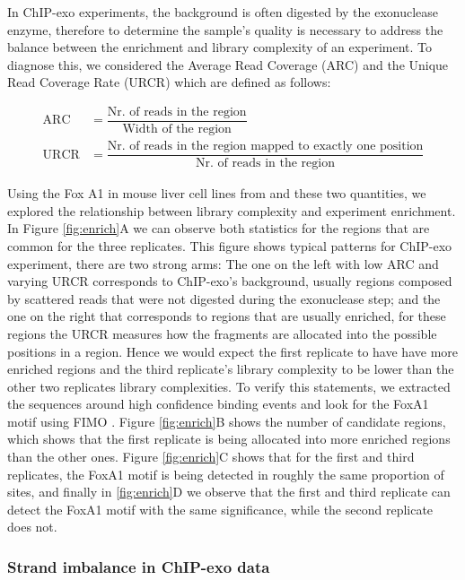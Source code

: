 \documentclass{bmcart}\usepackage[]{graphicx}\usepackage[]{color}
\begin{document}
In ChIP-exo experiments, the background is often digested by the
exonuclease enzyme, therefore to determine the sample's quality is
necessary to address the balance between the enrichment and library
complexity of an experiment. To diagnose this, we considered the
Average Read Coverage (ARC) and the Unique Read Coverage Rate (URCR)
which are defined as follows:

\begin{align*}
  \text{ARC} &= \dfrac{\text{Nr. of reads in the region}}{\text{Width of the region}} \\
  \text{URCR} &= \dfrac{\text{Nr. of reads in the region mapped to
      exactly one position}}{\text{Nr. of reads in the region}}
\end{align*}

Using the Fox A1 in mouse liver cell lines from \cite{exoillumina} and
these two quantities, we explored the relationship between library
complexity and experiment enrichment. In Figure \ref{fig:enrich}A we
can observe both statistics for the regions that are common for the
three replicates. This figure shows typical patterns for ChIP-exo
experiment, there are two strong arms: The one on the left with low
ARC and varying URCR corresponds to ChIP-exo's background, usually
regions composed by scattered reads that were not digested during the
exonuclease step; and the one on the right that corresponds to regions
that are usually enriched, for these regions the URCR measures how the
fragments are allocated into the possible positions in a region. Hence
we would expect the first replicate to have have more enriched regions
and the third replicate's library complexity to be lower than the
other two replicates library complexities. To verify this statements,
we extracted the sequences around high confidence binding events and
look for the FoxA1 motif using FIMO \cite{fimo}. Figure
\ref{fig:enrich}B shows the number of candidate regions, which shows
that the first replicate is being allocated into more enriched regions
than the other ones. Figure \ref{fig:enrich}C shows that for the first
and third replicates, the FoxA1 motif is being detected in roughly the
same proportion of sites, and finally in \ref{fig:enrich}D we observe
that the first and third replicate can detect the FoxA1 motif with the
same significance, while the second replicate does not.

\subsubsection{Strand imbalance in ChIP-exo data}
\end{document}
